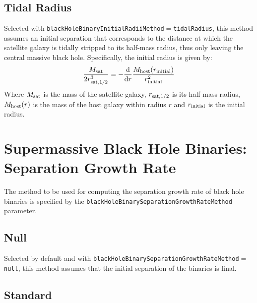 \subsection{Tidal Radius}

Selected with {\tt blackHoleBinaryInitialRadiiMethod}$=${\tt tidalRadius}, this method assumes an initial separation that corresponds to the distance at which the satellite galaxy is tidally stripped to its half-mass radius, thus only leaving the central massive black hole.
Specifically, the initial radius is given by:
\begin{equation}
{M_{\rm sat} \over 2 r_{\rm sat,1/2}^3 } = - {{\rm d} \over {\rm d} r} {M_{\rm host}(r_{\rm initial}) \over r_{\rm initial}^2}
\end{equation}
Where $M_{\rm sat}$ is the mass of the satellite galaxy, $r_{\rm sat,1/2}$ is its half mass radius, $M_{\rm host}(r)$ is the mass of the host galaxy within radius $r$ and $r_{\rm initial}$ is the initial radius.

\section{Supermassive Black Hole Binaries: Separation Growth Rate}

The method to be used for computing the separation growth rate of black hole binaries is specified by the {\tt blackHoleBinarySeparationGrowthRateMethod} parameter.

\subsection{Null}

Selected by default and with {\tt blackHoleBinarySeparationGrowthRateMethod}$=${\tt null}, this method assumes that the initial separation of the binaries is final.

\subsection{Standard}

